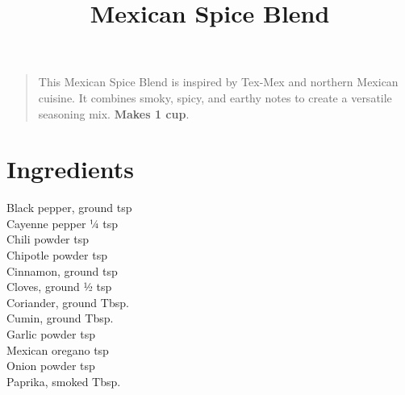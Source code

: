 \documentclass[11pt,letterpaper]{article}
\title{Mexican Spice Blend}
\author{}
\date{}
\begin{document}
\maketitle
\thispagestyle{empty}

\begin{quote}
\small
\begin{em}
This Mexican Spice Blend is inspired by Tex-Mex and northern Mexican cuisine. It combines smoky, spicy, and earthy notes to create a versatile seasoning mix. \textbf{Makes 1 cup}.
\end{em}
\end{quote}

\section*{Ingredients}
\setlength{\columnsep}{20pt}
\begin{multicols}{2}
\noindent
    Black pepper, ground  tsp \\
    Cayenne pepper \dotfill ¼ tsp \\
    Chili powder  tsp \\
    Chipotle powder  tsp \\
    Cinnamon, ground  tsp \\
    Cloves, ground \dotfill ½ tsp \\
    Coriander, ground  Tbsp. \\
    Cumin, ground  Tbsp. \\
    Garlic powder  tsp \\
    Mexican oregano  tsp \\
    Onion powder  tsp \\
    Paprika, smoked  Tbsp. \\
\end{multicols}
\end{document}
